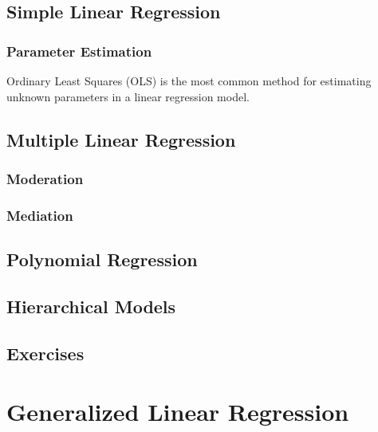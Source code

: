 \documentclass[]{book}
\begin{document}
\hypertarget{simple-linear-regression}{%
\section{Simple Linear Regression}\label{simple-linear-regression}}

\hypertarget{parameter-estimation}{%
\subsection{Parameter Estimation}\label{parameter-estimation}}

Ordinary Least Squares (OLS) is the most common method for estimating unknown parameters in a linear regression model.

\hypertarget{multiple-linear-regression}{%
\section{Multiple Linear Regression}\label{multiple-linear-regression}}

\hypertarget{moderation}{%
\subsection{Moderation}\label{moderation}}

\hypertarget{mediation}{%
\subsection{Mediation}\label{mediation}}

\hypertarget{polynomial-regression}{%
\section{Polynomial Regression}\label{polynomial-regression}}

\hypertarget{hierarchical-models}{%
\section{Hierarchical Models}\label{hierarchical-models}}

\hypertarget{exercises-7}{%
\section{Exercises}\label{exercises-7}}

\hypertarget{glm}{%
\chapter{Generalized Linear Regression}\label{glm}}
\end{document}
